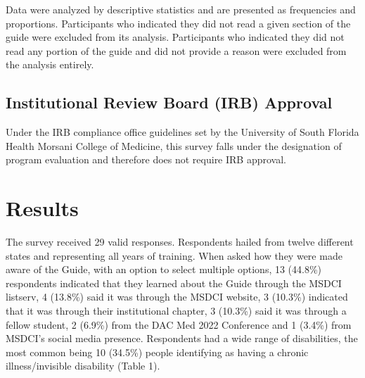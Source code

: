 \documentclass[11.5pt]{sig-alternate} %
\begin{document}
\begin{large}
Data were analyzed by descriptive statistics and are presented as frequencies and proportions. Participants who indicated they did not read a given section of the guide were excluded from its analysis. Participants who indicated they did not read any portion of the guide and did not provide a reason were excluded from the analysis entirely.

\subsection*{Institutional Review Board (IRB) Approval}

Under the IRB compliance office guidelines set by the University of South Florida Health Morsani College of Medicine, this survey falls under the designation of program evaluation and therefore does not require IRB approval.

\section*{Results}
The survey received 29 valid responses. Respondents hailed from twelve different states and representing all years of training. When asked how they were made aware of the Guide, with an option to select multiple options, 13 (44.8\%) respondents indicated that they learned about the Guide through the MSDCI listserv, 4 (13.8\%) said it was through the MSDCI website, 3 (10.3\%) indicated that it was through their institutional chapter, 3 (10.3\%) said it was through a fellow student, 2 (6.9\%) from the DAC Med 2022 Conference and 1 (3.4\%) from MSDCI’s social media presence. Respondents had a wide range of disabilities, the most common being 10 (34.5\%) people identifying as having a chronic illness/invisible disability (Table 1).


\end{large}
\end{document}

